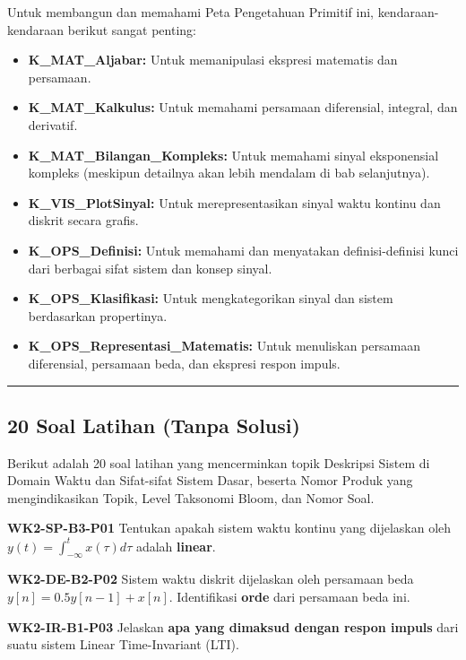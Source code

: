 \documentclass[
  letterpaper,
  DIV=11,
  numbers=noendperiod]{scrreprt}
\providecommand{\tightlist}{%
  \setlength{\itemsep}{0pt}\setlength{\parskip}{0pt}}
\begin{document}
Untuk membangun dan memahami Peta Pengetahuan Primitif ini,
kendaraan-kendaraan berikut sangat penting:

\begin{itemize}
\tightlist
\item
  \textbf{K\_MAT\_Aljabar:} Untuk memanipulasi ekspresi matematis dan
  persamaan.
\item
  \textbf{K\_MAT\_Kalkulus:} Untuk memahami persamaan diferensial,
  integral, dan derivatif.
\item
  \textbf{K\_MAT\_Bilangan\_Kompleks:} Untuk memahami sinyal
  eksponensial kompleks (meskipun detailnya akan lebih mendalam di bab
  selanjutnya).
\item
  \textbf{K\_VIS\_PlotSinyal:} Untuk merepresentasikan sinyal waktu
  kontinu dan diskrit secara grafis.
\item
  \textbf{K\_OPS\_Definisi:} Untuk memahami dan menyatakan
  definisi-definisi kunci dari berbagai sifat sistem dan konsep sinyal.
\item
  \textbf{K\_OPS\_Klasifikasi:} Untuk mengkategorikan sinyal dan sistem
  berdasarkan propertinya.
\item
  \textbf{K\_OPS\_Representasi\_Matematis:} Untuk menuliskan persamaan
  diferensial, persamaan beda, dan ekspresi respon impuls.
\end{itemize}

\begin{center}\rule{0.5\linewidth}{0.5pt}\end{center}

\subsection{20 Soal Latihan (Tanpa
Solusi)}\label{soal-latihan-tanpa-solusi}

Berikut adalah 20 soal latihan yang mencerminkan topik Deskripsi Sistem
di Domain Waktu dan Sifat-sifat Sistem Dasar, beserta Nomor Produk yang
mengindikasikan Topik, Level Taksonomi Bloom, dan Nomor Soal.

\textbf{WK2-SP-B3-P01} Tentukan apakah sistem waktu kontinu yang
dijelaskan oleh \(y(t) = \int_{-\infty}^{t} x(\tau) d\tau\) adalah
\textbf{linear}.

\textbf{WK2-DE-B2-P02} Sistem waktu diskrit dijelaskan oleh persamaan
beda \(y[n] = 0.5y[n-1] + x[n]\). Identifikasi \textbf{orde} dari
persamaan beda ini.

\textbf{WK2-IR-B1-P03} Jelaskan \textbf{apa yang dimaksud dengan respon
impuls} dari suatu sistem Linear Time-Invariant (LTI).
\end{document}
